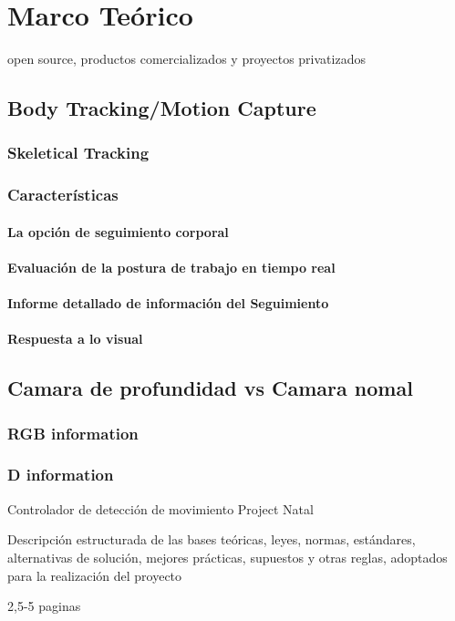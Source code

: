 \chapter{Marco Teórico}

open source, productos comercializados y proyectos privatizados

\section{Body Tracking/Motion Capture}
\subsection{Skeletical Tracking}
\subsection{Características}
\subsubsection{La opción de seguimiento corporal}
\subsubsection{Evaluación de la postura de trabajo en tiempo real}
\subsubsection{Informe detallado de información del Seguimiento}
\subsubsection{Respuesta a lo visual}




\section{Camara de profundidad vs Camara nomal}
\subsection{RGB information}
\subsection{D information}



Controlador de detección de movimiento
Project Natal \cite{juraj2016kinect}








Descripción estructurada de las bases teóricas,
leyes, normas, estándares, alternativas de solución,
mejores prácticas, supuestos y otras reglas,
adoptados para la realización del proyecto

2,5-5 paginas